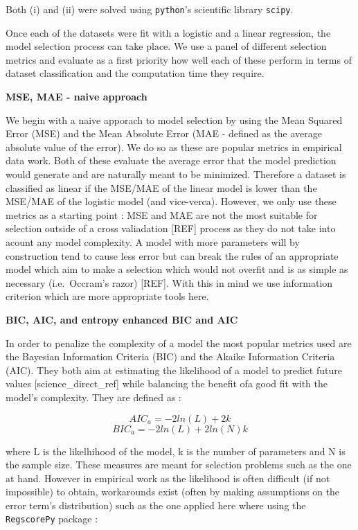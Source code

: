 \documentclass[]{article}
\begin{document}
Both (i) and (ii) were solved using \texttt{python}'s scientific library
\texttt{scipy}.

Once each of the datasets were fit with a logistic and a linear
regression, the model selection process can take place. We use a panel
of different selection metrics and evaluate as a first priority how well
each of these perform in terms of dataset classification and the
computation time they require.

\textbf{MSE, MAE - naive approach}

We begin with a naive apporach to model selection by using the Mean
Squared Error (MSE) and the Mean Absolute Error (MAE - defined as the
average absolute value of the error). We do so as these are popular
metrics in empirical data work. Both of these evaluate the average error
that the model prediction would generate and are naturally meant to be
minimized. Therefore a dataset is classified as linear if the MSE/MAE of
the linear model is lower than the MSE/MAE of the logistic model (and
vice-verca). However, we only use these metrics as a starting point :
MSE and MAE are not the most suitable for selection outside of a cross
valiadation {[}REF{]} process as they do not take into acount any model
complexity. A model with more parameters will by construction tend to
cause less error but can break the rules of an appropriate model which
aim to make a selection which would not overfit and is as simple as
necessary (i.e.~Occram's razor) {[}REF{]}. With this in mind we use
information criterion which are more appropriate tools here.

\textbf{BIC, AIC, and entropy enhanced BIC and AIC}

In order to penalize the complexity of a model the most popular metrics
used are the Bayesian Information Criteria (BIC) and the Akaike
Information Criteria (AIC). They both aim at estimating the likelihood
of a model to predict future values {[}science\_direct\_ref{]} while
balancing the benefit ofa good fit with the model's complexity. They are
defined as :

\[AIC_a = -2ln(L) + 2k\] \[BIC_a = -2ln(L) + 2ln(N)k\]

where L is the likelhihood of the model, k is the number of parameters
and N is the sample size. These measures are meant for selection
problems such as the one at hand. However in empirical work as the
likelihood is often difficult (if not impossible) to obtain, workarounds
exist (often by making assumptions on the error term's distribution)
such as the one applied here where using the \texttt{RegscorePy} package
:
\end{document}
